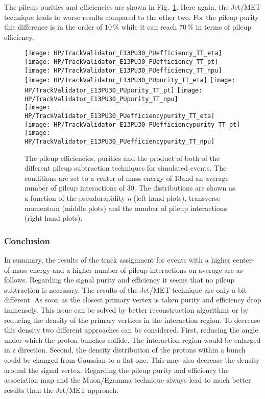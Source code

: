 The pileup purities and efficiencies are shown in Fig.~\ref{plot:HPUTAE13PU30TTPUComp}. Here again, the Jet/MET technique leads to worse results compared to the other two. For the pileup purity this difference is in the order of $10\,\%$ while it can reach $70\,\%$ in terms of pileup efficiency. 

\begin{figure}[!t]
  \centering
  \texttt{[image: HP/TrackValidator\_E13PU30\_PUefficiency\_TT\_eta]}
  \texttt{[image: HP/TrackValidator\_E13PU30\_PUefficiency\_TT\_pt]}
  \texttt{[image: HP/TrackValidator\_E13PU30\_PUefficiency\_TT\_npu]}
   \\
  \texttt{[image: HP/TrackValidator\_E13PU30\_PUpurity\_TT\_eta]}
  \texttt{[image: HP/TrackValidator\_E13PU30\_PUpurity\_TT\_pt]}
  \texttt{[image: HP/TrackValidator\_E13PU30\_PUpurity\_TT\_npu]}
   \\
  \texttt{[image: HP/TrackValidator\_E13PU30\_PUefficiencypurity\_TT\_eta]}
  \texttt{[image: HP/TrackValidator\_E13PU30\_PUefficiencypurity\_TT\_pt]}
  \texttt{[image: HP/TrackValidator\_E13PU30\_PUefficiencypurity\_TT\_npu]}
  \caption[Pileup efficiencies, purities and their product of the different pileup subtraction techniques for \ttbar events with 13\TeV and PU=30]{The pileup efficiencies, purities and the product of both of the different pileup subtraction techniques for simulated \ttbar events. The conditions are set to a center-of-mass energy of 13\TeV and an average number of pileup interactions of 30. The distributions are shown as a function of the pseudorapidity $\eta$ (left hand plots), transverse momentum (middle plots) and the number of pileup interactions (right hand plots). \label{plot:HPUTAE13PU30TTPUComp}}
\end{figure}

\subsubsection{Conclusion}

In summary, the results of the track assignment for events with a higher center-of-mass energy and a higher number of pileup interactions on average are as follows. Regarding the signal purity and efficiency it seems that no pileup subtraction is necessary. The results of the Jet/MET technique are only a bit different. As soon as the closest primary vertex is taken purity and efficiency drop immensely. This issue can be solved by better reconstruction algorithms or by reducing the density of the primary vertices in the interaction region. To decrease this density two different approaches can be considered. First, reducing the angle under which the proton bunches collide. The interaction region would be enlarged in z direction. Second, the density distribution of the protons within a bunch could be changed from Gaussian to a flat one. This may also decrease the density around the signal vertex. Regarding the pileup purity and efficiency the association map and the Muon/Egamma technique always lead to much better results than the Jet/MET approach.

